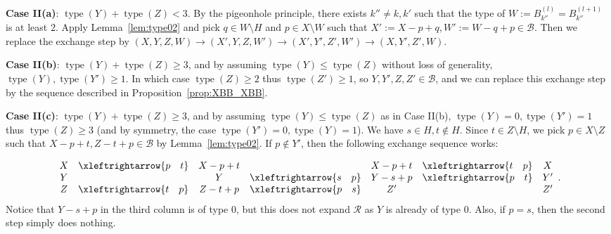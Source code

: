 \documentclass{amsart}
\newcommand{\swap}[2]{\xleftrightarrow{#1 \quad #2}}
\newcommand\Bcal{{\mathcal B}}
\newcommand\Rcal{{\mathcal R}}
\DeclareMathOperator{\type}{type}
\begin{document}
{\bf Case II(a)}: $\type(Y)+\type(Z)<3$. By the pigeonhole principle, there exists $k''\neq k,k'$ such that the type of $W:=B_{k''}^{(l)}=B_{k''}^{(l+1)}$ is at least $2$. Apply Lemma~\ref{lem:type02} and pick $q\in W\setminus H$ and $p\in X\setminus W$ such that $X':=X-p+q,W':=W-q+p\in\Bcal$. Then we replace the exchange step by $(X,Y,Z,W)\rightarrow (X',Y,Z,W')\rightarrow(X',Y',Z',W')\rightarrow(X,Y',Z',W)$.

{\bf Case II(b)}: $\type(Y)+\type(Z)\geq 3$, and by assuming $\type(Y)\leq\type(Z)$ without loss of generality, $\type(Y),\type(Y')\geq 1$. In which case $\type(Z)\geq 2$ thus $\type(Z')\geq 1$, so $Y,Y',Z,Z'\in\Bcal$, and we can replace this exchange step by the sequence described in Proposition~\ref{prop:XBB_XBB}.

{\bf Case II(c)}: $\type(Y)+\type(Z)\geq 3$, and by assuming $\type(Y)\leq\type(Z)$ as in Case II(b), $\type(Y)=0,\type(Y')=1$ thus $\type(Z)\geq 3$ (and by symmetry, the case $\type(Y')=0,\type(Y)=1$). We have $s\in H, t\not\in H$. Since $t\in Z\setminus H$, we pick $p\in X\setminus Z$ such that $X-p+t, Z-t+p\in\Bcal$ by Lemma~\ref{lem:type02}. If $p\not\in Y'$, then the following exchange sequence works:

$$
\begin{array}{c c c c c c c}
   X & \swap{p}{t} & X-p+t &       & X-p+t & \swap{t}{p}   & X \\
   Y &            & Y &  \swap{s}{p}  & Y-s+p & \swap{p}{t}   & Y' \\
   Z & \swap{t}{p}  & Z-t+p & \swap{p}{s}  & Z' &          & Z'
\end{array}.
$$
Notice that $Y-s+p$ in the third column is of type 0, but this does not expand $\Rcal$ as $Y$ is already of type 0. Also, if $p=s$, then the second step simply does nothing.
\end{document}
